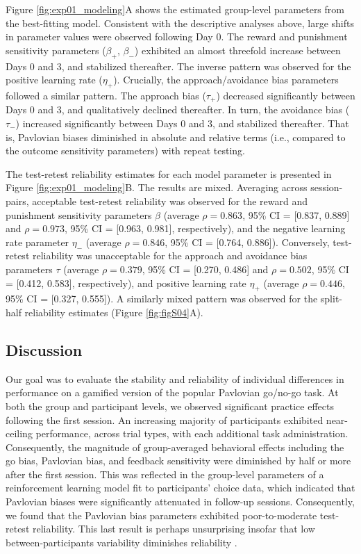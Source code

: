 \documentclass[a4paper,12pt]{article}
\begin{document}
\begin{refsection}[main]
Figure \ref{fig:exp01_modeling}A shows the estimated group-level parameters from the best-fitting model. Consistent with the descriptive analyses above, large shifts in parameter values were observed following Day 0. The reward and punishment sensitivity parameters ($\beta_+$, $\beta_-$) exhibited an almost threefold increase between Days 0 and 3, and stabilized thereafter. The inverse pattern was observed for the positive learning rate ($\eta_+$). Crucially, the approach/avoidance bias parameters followed a similar pattern. The approach bias ($\tau_+$)  decreased significantly between Days 0 and 3, and qualitatively declined thereafter. In turn, the avoidance bias ($\tau_-$) increased significantly between Days 0 and 3, and stabilized thereafter. That is, Pavlovian biases diminished in absolute and relative terms (i.e., compared to the outcome sensitivity parameters) with repeat testing. 

The test-retest reliability estimates for each model parameter is presented in Figure \ref{fig:exp01_modeling}B. The results are mixed. Averaging across session-pairs, acceptable test-retest reliability was observed for the reward and punishment sensitivity parameters $\beta$ (average $\rho = 0.863$, 95\% CI = [0.837, 0.889] and $\rho = 0.973$, 95\% CI = [0.963, 0.981], respectively), and the negative learning rate parameter $\eta_-$ (average $\rho = 0.846$, 95\% CI = [0.764, 0.886]). Conversely, test-retest reliability was unacceptable for the approach and avoidance bias parameters $\tau$ (average $\rho = 0.379$, 95\% CI = [0.270, 0.486] and $\rho = 0.502$, 95\% CI = [0.412, 0.583], respectively), and positive learning rate $\eta_+$ (average $\rho = 0.446$, 95\% CI = [0.327, 0.555]). A similarly mixed pattern was observed for the split-half reliability estimates (Figure \ref{fig:figS04}A).

\subsection*{Discussion}

Our goal was to evaluate the stability and reliability of individual differences in performance on a gamified version of the popular Pavlovian go/no-go task. At both the group and participant levels, we observed significant practice effects following the first session. An increasing majority of participants exhibited near-ceiling performance, across trial types, with each additional task administration. Consequently, the magnitude of group-averaged behavioral effects including the go bias, Pavlovian bias, and feedback sensitivity were diminished by half or more after the first session. This was reflected in the group-level parameters of a reinforcement learning model fit to participants' choice data, which indicated that Pavlovian biases were significantly attenuated in follow-up sessions. Consequently, we found that the Pavlovian bias parameters exhibited poor-to-moderate test-retest reliability. This last result is perhaps unsurprising insofar that low between-participants variability diminishes reliability \cite{zorowitz2023improving}.  


\end{refsection}
\end{document}

